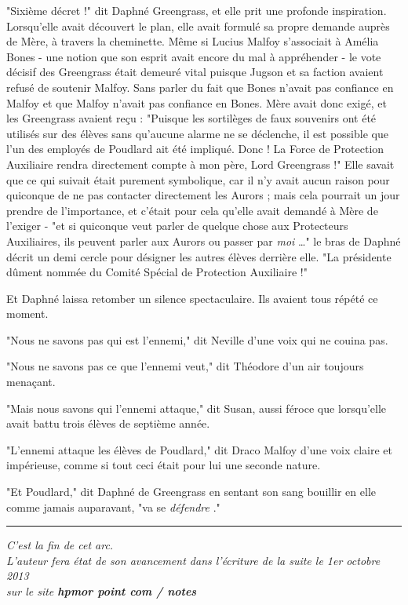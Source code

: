 "Sixième décret !" dit Daphné Greengrass, et elle prit une profonde inspiration. Lorsqu'elle avait découvert le plan, elle avait formulé sa propre demande auprès de Mère, à travers la cheminette. Même si Lucius Malfoy s'associait à Amélia Bones - une notion que son esprit avait encore du mal à appréhender - le vote décisif des Greengrass était demeuré vital puisque Jugson et sa faction avaient refusé de soutenir Malfoy. Sans parler du fait que Bones n'avait pas confiance en Malfoy et que Malfoy n'avait pas confiance en Bones. Mère avait donc exigé, et les Greengrass avaient reçu : "Puisque les sortilèges de faux souvenirs ont été utilisés sur des élèves sans qu'aucune alarme ne se déclenche, il est possible que l'un des employés de Poudlard ait été impliqué. Donc ! La Force de Protection Auxiliaire rendra directement compte à mon père, Lord Greengrass !" Elle savait que ce qui suivait était purement symbolique, car il n'y avait aucun raison pour quiconque de ne pas contacter directement les Aurors ; mais cela pourrait un jour prendre de l'importance, et c'était pour cela qu'elle avait demandé à Mère de l'exiger - "et si quiconque veut parler de quelque chose aux Protecteurs Auxiliaires, ils peuvent parler aux Aurors ou passer par \emph{moi} …" le bras de Daphné décrit un demi cercle pour désigner les autres élèves derrière elle. "La présidente dûment nommée du Comité Spécial de Protection Auxiliaire !"

Et Daphné laissa retomber un silence spectaculaire. Ils avaient tous répété ce moment.

"Nous ne savons pas qui est l'ennemi," dit Neville d'une voix qui ne couina pas.

"Nous ne savons pas ce que l'ennemi veut," dit Théodore d'un air toujours menaçant.

"Mais nous savons qui l'ennemi attaque," dit Susan, aussi féroce que lorsqu'elle avait battu trois élèves de septième année.

"L'ennemi attaque les élèves de Poudlard," dit Draco Malfoy d'une voix claire et impérieuse, comme si tout ceci était pour lui une seconde nature.

"Et Poudlard," dit Daphné de Greengrass en sentant son sang bouillir en elle comme jamais auparavant, "va se \emph{défendre} ."
\par\noindent\rule{\textwidth}{0.4pt}

\begin{center}\emph{C'est la fin de cet arc.} \\\emph{L'auteur fera état de son avancement dans l'écriture de la suite le 1er octobre 2013 } \\\emph{sur le site \textbf{hpmor point com / notes} } \end{center}


